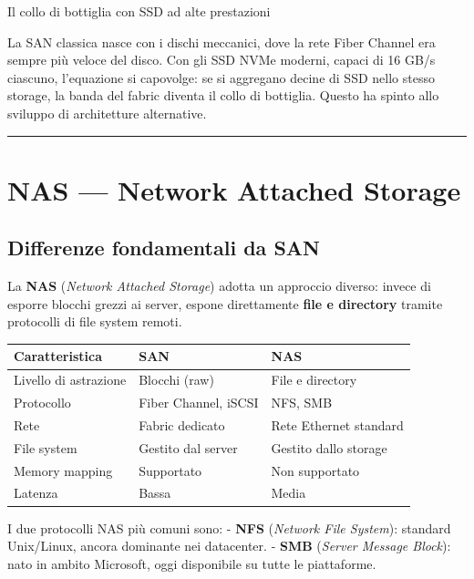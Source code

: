 \documentclass[
  italian,
  openany]{book}
\newcounter{none} %
\begin{document}
\begin{calloutwarning}{Il collo di bottiglia con SSD ad alte prestazioni}

La SAN classica nasce con i dischi meccanici, dove la rete Fiber Channel
era sempre più veloce del disco. Con gli SSD NVMe moderni, capaci di 16
GB/s ciascuno, l'equazione si capovolge: se si aggregano decine di SSD
nello stesso storage, la banda del fabric diventa il collo di bottiglia.
Questo ha spinto allo sviluppo di architetture alternative.

\end{calloutwarning}

\begin{center}\rule{0.5\linewidth}{0.5pt}\end{center}

\section{NAS --- Network Attached
Storage}\label{nas-network-attached-storage}

\subsection{Differenze fondamentali da
SAN}\label{differenze-fondamentali-da-san}

La \textbf{NAS} (\emph{Network Attached Storage}) adotta un approccio
diverso: invece di esporre blocchi grezzi ai server, espone direttamente
\textbf{file e directory} tramite protocolli di file system remoti.

{\def\LTcaptype{none} %
\begin{longtable}[]{@{}lll@{}}
\toprule\noalign{}
Caratteristica & SAN & NAS \\
\midrule\noalign{}
\endhead
\bottomrule\noalign{}
\endlastfoot
Livello di astrazione & Blocchi (raw) & File e directory \\
Protocollo & Fiber Channel, iSCSI & NFS, SMB \\
Rete & Fabric dedicato & Rete Ethernet standard \\
File system & Gestito dal server & Gestito dallo storage \\
Memory mapping & Supportato & Non supportato \\
Latenza & Bassa & Media \\
\end{longtable}
}

I due protocolli NAS più comuni sono: - \textbf{NFS} (\emph{Network File
System}): standard Unix/Linux, ancora dominante nei datacenter. -
\textbf{SMB} (\emph{Server Message Block}): nato in ambito Microsoft,
oggi disponibile su tutte le piattaforme.
\end{document}
